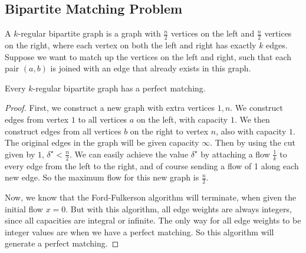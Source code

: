 \subsection{Bipartite Matching Problem}
A \( k \)-regular bipartite graph is a graph with \( \frac{n}{2} \) vertices on the left and \( \frac{n}{2} \) vertices on the right, where each vertex on both the left and right has exactly \( k \) edges.
Suppose we want to match up the vertices on the left and right, such that each pair \( (a,b) \) is joined with an edge that already exists in this graph.
\begin{theorem}
	Every \( k \)-regular bipartite graph has a perfect matching.
\end{theorem}
\begin{proof}
	First, we construct a new graph with extra vertices \( 1, n \).
	We construct edges from vertex \( 1 \) to all vertices \( a \) on the left, with capacity \( 1 \).
	We then construct edges from all vertices \( b \) on the right to vertex \( n \), also with capacity \( 1 \).
	The original edges in the graph will be given capacity \( \infty \).
	Then by using the cut given by \( { 1 } \), \( \delta^\star < \frac{n}{2} \).
	We can easily achieve the value \( \delta^\star \) by attaching a flow \( \frac{1}{k} \) to every edge from the left to the right, and of course sending a flow of 1 along each new edge.
	So the maximum flow for this new graph is \( \frac{n}{2} \).

	Now, we know that the Ford-Fulkerson algorithm will terminate, when given the initial flow \( x = 0 \).
	But with this algorithm, all edge weights are always integers, since all capacities are integral or infinite.
	The only way for all edge weights to be integer values are when we have a perfect matching.
	So this algorithm will generate a perfect matching.
\end{proof}

